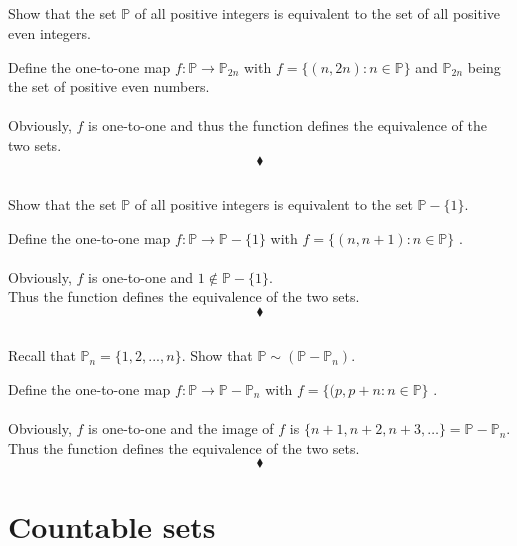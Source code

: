 \subsection{}
\begin{tcolorbox}
Show that the set $\mathbb{P}$ of all positive integers is equivalent to the set of all positive even integers.
\end{tcolorbox}
$$ $$
 Define the one-to-one map $f:\mathbb{P}\rightarrow \mathbb{P}_{2n}$ with $f=\{(n,2n):n\in \mathbb{P}\}$ and  $\mathbb{P}_{2n}$ being the set of positive even numbers.\\\\
 Obviously, $f$ is one-to-one and thus the function defines the equivalence of the two sets. 
$$\blacklozenge$$

\subsection{}
\begin{tcolorbox}
Show that the set $\mathbb{P}$ of all positive integers is equivalent to the set $\mathbb{P}-\{1\}$.  
\end{tcolorbox}
$$ $$
 Define the one-to-one map $f:\mathbb{P}\rightarrow \mathbb{P}-\{1\}$ with $f=\{(n,n+1):n\in \mathbb{P}\}$ .\\\\
 Obviously, $f$ is one-to-one and $1\not \in \mathbb{P}-\{1\}$.\\ Thus the function defines the equivalence of the two sets. 
$$\blacklozenge$$

\subsection{}
\begin{tcolorbox}
Recall that $\mathbb{P}_n = \{1, 2, ... , n\}$. Show that $\mathbb{P} \sim  (\mathbb{P}-\mathbb{P}_n)$.
\end{tcolorbox}
$$ $$
Define the one-to-one map $f:\mathbb{P}\rightarrow \mathbb{P}-\mathbb{P}_n$ with $f=\{(p,p+n:n\in \mathbb{P}\}$ .\\\\
 Obviously, $f$ is one-to-one and the image of $f$ is $\{n+1,n+2,n+3,\dots\} = \mathbb{P}-\mathbb{P}_n$.\\ Thus the function defines the equivalence of the two sets. 
$$\blacklozenge$$

\newpage

 \section{Countable sets}
